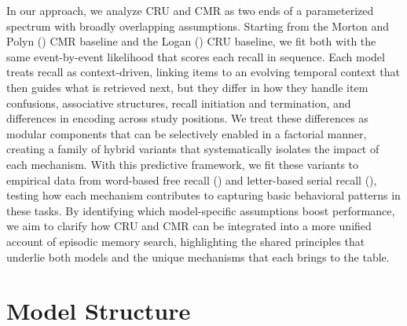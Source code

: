 \documentclass[
  man,
  floatsintext,
  longtable,
  nolmodern,
  notxfonts,
  notimes,
  draftfirst,
  colorlinks=true,linkcolor=blue,citecolor=blue,urlcolor=blue]{apa7}
\begin{document}
In our approach, we analyze CRU and CMR as two ends of a parameterized
spectrum with broadly overlapping assumptions. Starting from the Morton
and Polyn () CMR baseline and
the Logan () CRU baseline, we fit
both with the same event-by-event likelihood that scores each recall in
sequence. Each model treats recall as context-driven, linking items to
an evolving temporal context that then guides what is retrieved next,
but they differ in how they handle item confusions, associative
structures, recall initiation and termination, and differences in
encoding across study positions. We treat these differences as modular
components that can be selectively enabled in a factorial manner,
creating a family of hybrid variants that systematically isolates the
impact of each mechanism. With this predictive framework, we fit these
variants to empirical data from word-based free recall
() and
letter-based serial recall (), testing how each mechanism contributes to capturing basic
behavioral patterns in these tasks. By identifying which model-specific
assumptions boost performance, we aim to clarify how CRU and CMR can be
integrated into a more unified account of episodic memory search,
highlighting the shared principles that underlie both models and the
unique mechanisms that each brings to the table.

\section{Model Structure}\label{model-structure}
\end{document}
